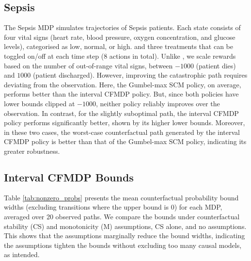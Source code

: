 \subsection{Sepsis}
The Sepsis MDP \citep{oberst2019counterfactual} simulates trajectories of Sepsis patients. Each state consists of four vital signs (heart rate, blood pressure, oxygen concentration, and glucose levels), categorised as low, normal, or high.
and three treatments that can be toggled on/off at each time step (8 actions in total). Unlike \citet{oberst2019counterfactual}, we scale rewards based on the number of out-of-range vital signs, between $-1000$ (patient dies) and $1000$ (patient discharged).  However, improving the catastrophic path requires deviating from the observation. Here, the Gumbel-max SCM policy, on average, performs better than the interval CFMDP policy. But, since both policies have lower bounds clipped at $-1000$, neither policy reliably improves over the observation. In contrast, for the slightly suboptimal path, the interval CFMDP policy performs significantly better, shown by its higher lower bounds. 
Moreover, in these two cases, the worst-case counterfactual path generated by the interval CFMDP policy is better than that of the Gumbel-max SCM policy,
indicating its greater robustness.
%


%
%
%
\subsection{Interval CFMDP Bounds}
%
%
Table \ref{tab:nonzero_probs} presents the mean counterfactual probability bound widths (excluding transitions where the upper bound is $0$) for each MDP, averaged over 20 observed paths. We compare the bounds under counterfactual stability (CS) and monotonicity (M) assumptions, CS alone, and no assumptions. This shows that the assumptions marginally reduce the bound widths, indicating the assumptions tighten the bounds without excluding too many causal models, as intended.

